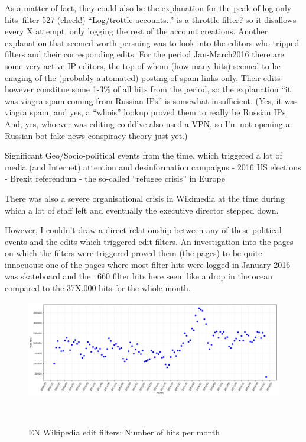 As a matter of fact, they could also be the explanation for the peak of log only hits–filter 527 (check!) ``Log/trottle accounts..'' is a throttle filter? so it disallows every X attempt, only logging the rest of the account creations.
Another explanation that seemed worth persuing was to look into the editors who tripped filters and their corresponding edits.
For the period Jan-March2016 there are some very active IP editors, the top of whom (how many hits) seemed to be enaging of the (probably automated) posting of spam links only.
Their edits however constitue some 1-3\% of all hits from the period, so the explanation ``it was viagra spam coming from Russian IPs'' is somewhat insufficient.
(Yes, it was viagra spam, and yes, a ``whois'' lookup proved them to really be Russian IPs.
And, yes, whoever was editing could've also used a VPN, so I'm not opening a Russian bot fake news conspiracy theory just yet.)


Significant Geo/Socio-political events from the time, which triggered a lot of media (and Internet) attention and desinformation campaigns
- 2016 US elections
- Brexit referendum
- the so-called ``refugee crisis'' in Europe

There was also a severe organisational crisis in Wikimedia at the time during which a lot of staff left and eventually the executive director stepped down.


However, I couldn't draw a direct relationship between any of these political events and the edits which triggered edit filters.
An investigation into the pages on which the filters were triggered proved them (the pages) to be quite innocuous:
one of the pages where most filter hits were logged in January 2016 was skateboard and the ~660 filter hits here seem like a drop in the ocean compared to the 37X.000 hits for the whole month.


\begin{figure}
\centering
  \includegraphics[width=0.9\columnwidth]{pics/filter-hits-zoomed.png}
  \caption{EN Wikipedia edit filters: Number of hits per month}~\label{fig:filter-hits}
\end{figure}


